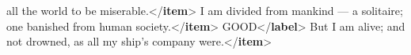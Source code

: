 \begin{shaded}
\hspace*{1em}\hspace*{1em}\hspace*{1em}\hspace*{1em}\hspace*{1em}\hspace*{1em} all the world to be miserable.{</\textbf{item}>}\mbox{}\newline 
\hspace*{1em}\hspace*{1em}I am divided from mankind — a solitaire; one\mbox{}\newline 
\hspace*{1em}\hspace*{1em}\hspace*{1em}\hspace*{1em}\hspace*{1em}\hspace*{1em} banished from human society.{</\textbf{item}>}\mbox{}\newline 
\hspace*{1em}\mbox{}\newline 
{}\mbox{}\newline 
{}GOOD{</\textbf{label}>}\mbox{}\newline 
{}\mbox{}\newline 
\hspace*{1em}\mbox{}\newline 
\hspace*{1em}\hspace*{1em}But I am alive; and not drowned, as all my\mbox{}\newline 
\hspace*{1em}\hspace*{1em}\hspace*{1em}\hspace*{1em}\hspace*{1em}\hspace*{1em} ship's company were.{</\textbf{item}>}\mbox{}\newline 

\end{shaded}
